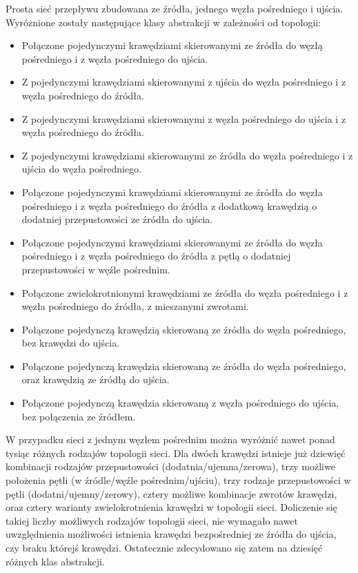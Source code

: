 \documentclass[10pt]{dokument-tiwo}
\begin{document}
Prosta sieć przepływu zbudowana ze źródła, jednego węzła pośredniego i ujścia. Wyróżnione zostały następujące klasy abstrakcji w zależności od topologii:
\begin{itemize}
    \item Połączone pojedynczymi krawędziami skierowanymi ze źródła do węzłą pośredniego i z węzła pośredniego do ujścia.
    \item Z pojedynczymi krawędziami skierowanymi z ujścia do węzła pośredniego i z węzła pośredniego do źródła.
    \item Z pojedynczymi krawędziami skierowanymi z węzła pośredniego do ujścia i z węzła pośredniego do źródła.
    \item Z pojedynczymi krawędziami skierowanymi ze źródła do węzła pośredniego i z ujścia do węzła pośredniego.
    \item Połączone pojedynczymi krawędziami skierowanymi ze źródła do węzła pośredniego i z węzła pośredniego do źródła z dodatkową krawędzią o dodatniej przepustowości ze źródła do ujścia.
    \item Połączone pojedynczymi krawędziami skierowanymi ze źródła do węzła pośredniego i z węzła pośredniego do źródła z pętlą o dodatniej przepustowości w węźle pośrednim.
    \item Połączone zwielokrotnionymi krawędziami ze źródła do węzła pośredniego i z węzła pośredniego do źródła, z mieszanymi zwrotami.
    \item Połączone pojedynczą krawędzią skierowaną ze źródła do węzła pośredniego, bez krawędzi do ujścia.
    \item Połączone pojedynczą krawędzia skierowaną ze źródła do węzła pośredniego, oraz krawędzią ze źródłą do ujścia.
    \item Połączone pojedynczą krawędzia skierowaną z węzła pośredniego do ujścia, bez połączenia ze źródłem.

\end{itemize}
W przypadku sieci z jednym węzłem pośrednim można wyróżnić nawet ponad tysiąc różnych rodzajów topologii sieci. Dla dwóch krawędzi istnieje już dziewięć kombinacji rodzajów przepustowości (dodatnia/ujemna/zerowa), trzy możliwe położenia pętli (w źródle/węźle pośrednim/ujściu), trzy rodzaje przepustowości w pętli (dodatni/ujemny/zerowy), cztery możliwe kombinacje zwrotów krawędzi, oraz cztery warianty zwielokrotnienia krawędzi w topologii sieci. Doliczenie się takiej liczby możliwych rodzajów topologii sieci, nie wymagało nawet uwzględnienia możliwości istnienia krawędzi bezpośredniej ze źródła do ujścia, czy braku którejś krawędzi. Ostatecznie zdecydowano się zatem na dziesięć różnych klas abstrakcji.
\end{document}
